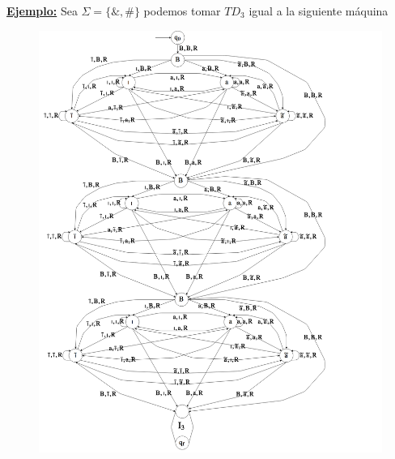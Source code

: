 \begin{frame}
  \PN \underline{\textbf{Ejemplo:}} Sea $\Sigma = \{\&,\#\}$ podemos tomar $TD_{3}$ igual a la siguiente máquina
  \begin{figure}[h]
    \centering
    \includegraphics[scale=0.26]{graphics/figure_3.png}
  \end{figure}
\end{frame}
